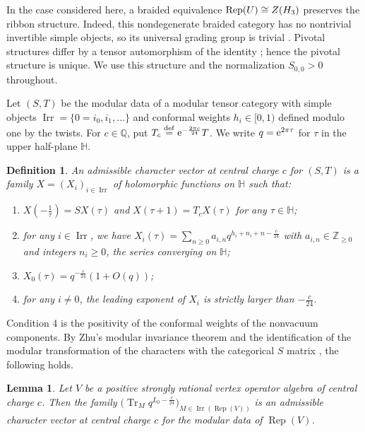 \documentclass[leqno]{article}
\let\cal\relax
\newcommand{\cal}{\mathcal}
\newcommand{\Z}{\ensuremath{\mathbb{Z}}}
\renewcommand{\geq}{\ensuremath{\geqslant}}
\let\i\relax
\newcommand{\i}{\mathrm{i}}
\newcommand{\ov}{\overset}
\newcommand{\e}{\mathrm{e}}
\DeclareMathOperator{\Tr}{Tr}
\DeclareMathOperator{\Irr}{Irr}
\DeclareMathOperator{\Rep}{Rep}
\newtheorem{defi}[thm]{Definition}
\newtheorem{lemma}[thm]{Lemma}
\numberwithin{equation}{section}
\begin{document}
In the case considered here, a braided equivalence $\Rep(U) \cong Z(\cal H_3)$ preserves the ribbon structure. Indeed, this nondegenerate braided category has no nontrivial invertible simple objects, so its universal grading group is trivial \cite[Theorem 6.3]{GeN08}. Pivotal structures differ by a tensor automorphism of the identity \cite{ENO05}; hence the pivotal structure is unique. We use this structure and the normalization $S_{0,0} > 0$ throughout.

Let $(S,T)$ be the modular data of a modular tensor category with simple objects $\Irr = \{0 = i_0,i_1,\ldots\}$ and conformal weights $h_i \in [0,1)$ defined modulo one by the twists. For $c \in \mathbb{Q}$, put $T_c \ov{\mathrm{def}}{=} \e^{-\frac{2\pi\i c}{24}}T$. We write $q = \e^{2\pi\i\tau}$ for $\tau$ in the upper half-plane $\mathbb H$.

\begin{defi}
\label{def:admissible}
An admissible character vector at central charge $c$ for $(S,T)$ is a family $X = (X_i)_{i \in \Irr}$ of holomorphic functions on $\mathbb H$ such that:
\begin{enumerate}
\item $X(-\frac{1}{\tau}) = SX(\tau)$ and $X(\tau+1) = T_cX(\tau)$ for any $\tau \in \mathbb H$;
\item for any $i \in \Irr$, we have $X_i(\tau) = \sum_{n \geq 0} a_{i,n}q^{h_i+n_i+n-\frac{c}{24}}$ with $a_{i,n} \in \Z_{\geq 0}$ and integers $n_i \geq 0$, the series converging on $\mathbb H$;
\item $X_0(\tau) = q^{-\frac{c}{24}}(1+O(q))$;
\item for any $i \neq 0$, the leading exponent of $X_i$ is strictly larger than $-\frac{c}{24}$.
\end{enumerate}
\end{defi}

Condition 4 is the positivity of the conformal weights of the nonvacuum components. By Zhu's modular invariance theorem \cite{Zhu96} and the identification of the modular transformation of the characters with the categorical $S$ matrix \cite{Hua08}, the following holds.

\begin{lemma}
\label{lem:characters-admissible}
Let $V$ be a positive strongly rational vertex operator algebra of central charge $c$. Then the family $\big(\Tr_{M}q^{L_0-\frac{c}{24}}\big)_{M \in \Irr(\Rep(V))}$ is an admissible character vector at central charge $c$ for the modular data of $\Rep(V)$.
\end{lemma}
\end{document}
